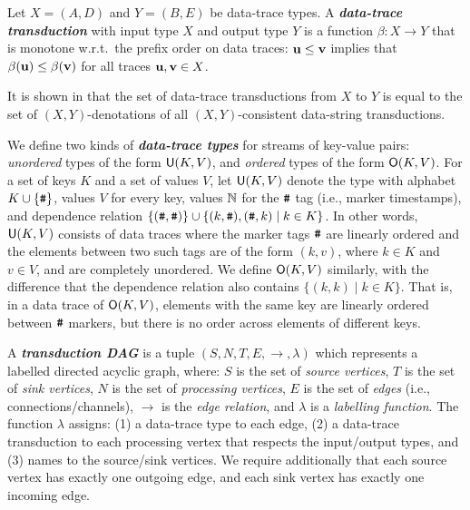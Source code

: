 \begin{definition}
Let $X = (A,D)$ and $Y = (B,E)$ be data-trace types. A \textbf{\em data-trace transduction} with input type $X$ and output type $Y$ is a function $\beta: X \to Y$ that is monotone w.r.t.\ the prefix order on data traces: $\mathbf{u} \leq \mathbf{v}$ implies that $\beta(\mathbf{u}) \leq \beta(\mathbf{v})$ for all traces $\mathbf{u}, \mathbf{v} \in X$.
\end{definition}

It is shown in \cite{festschrift18} that the set of data-trace transductions from $X$ to $Y$ is equal to the set of $(X,Y)$-denotations of all $(X,Y)$-consistent data-string transductions.

We define two kinds of \textbf{\em data-trace types} for streams of key-value pairs: \emph{unordered} types of the form $\mathsf{U}(K,V)$, and \emph{ordered} types of the form $\mathsf{O}(K,V)$. For a set of keys $K$ and a set of values $V$, let $\mathsf{U}(K, V)$ denote the type with alphabet $K \cup \{\texttt{\#}\}$, values $V$ for every key, values $\mathbb{N}$ for the $\texttt{\#}$ tag (i.e., marker timestamps), and dependence relation $\{ (\texttt{\#}, \texttt{\#}) \} \cup \{ (k,\texttt{\#}), (\texttt{\#},k) \mid k \in K \}$. In other words, $\mathsf{U}(K, V)$ consists of data traces where the marker tags $\texttt{\#}$ are linearly ordered and the elements between two such tags are of the form $(k,v)$, where $k \in K$ and $v \in V$, and are completely unordered. We define $\mathsf{O}(K, V)$ similarly, with the difference that the dependence relation also contains $\{ (k,k) \mid k \in K \}$. That is, in a data trace of $\mathsf{O}(K,V)$, elements with the same key are linearly ordered between $\texttt{\#}$ markers, but there is no order across elements of different keys.

A \textbf{\em transduction DAG} is a tuple $(S,N,T,E,\to,\lambda)$ which represents a labelled directed acyclic graph, where: $S$ is the set of \emph{source vertices}, $T$ is the set of \emph{sink vertices}, $N$ is the set of \emph{processing vertices}, $E$ is the set of \emph{edges} (i.e., connections/channels), $\to$ is the \emph{edge relation}, and $\lambda$ is a \emph{labelling function}. The function $\lambda$ assigns: (1) a data-trace type to each edge, (2) a data-trace transduction to each processing vertex that respects the input/output types, and (3) names to the source/sink vertices. We require additionally that each source vertex has exactly one outgoing edge, and each sink vertex has exactly one incoming edge.

